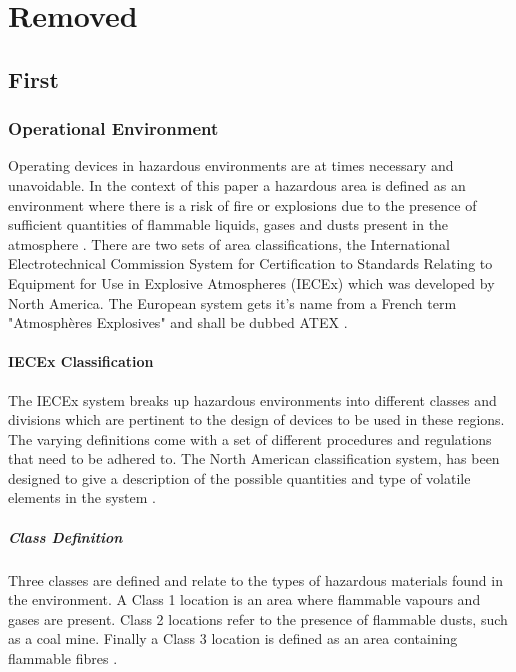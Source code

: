 \chapter{Removed}
\section{First}
\subsection{Operational Environment}
Operating devices in hazardous environments are at times necessary and unavoidable. In the context of this paper a hazardous area is defined as an environment where there is a risk of fire or explosions due to the presence of sufficient quantities of flammable liquids, gases and dusts present in the atmosphere \cite{RockwellAutomation, STAHL}. There are two sets of area classifications, the International Electrotechnical Commission System for Certification to Standards  Relating to Equipment for Use in Explosive Atmospheres (IECEx) which was developed by North America. The European system gets it's name from a French term "Atmosph\`{e}res Explosives" and shall be dubbed ATEX \cite{ATEX, RockwellAutomation, STAHL}.

\subsubsection{IECEx Classification}
The IECEx system breaks up hazardous environments into different classes and divisions which are pertinent to the design of devices to be used in these regions. The varying definitions come with a set of different procedures and regulations that need to be adhered to. The North American classification system, has been designed to give a description of the possible quantities and type of volatile elements in the system \cite{RockwellAutomation, IECEx}.
 
\paragraph{Class Definition}
Three classes are defined and relate to the types of hazardous materials found in the environment. A Class 1 location is an area where flammable vapours and gases are present. Class 2 locations refer to the presence of flammable dusts, such as a coal mine. Finally a Class 3 location is defined as an area containing flammable fibres \cite{RockwellAutomation, IECEx}. 


